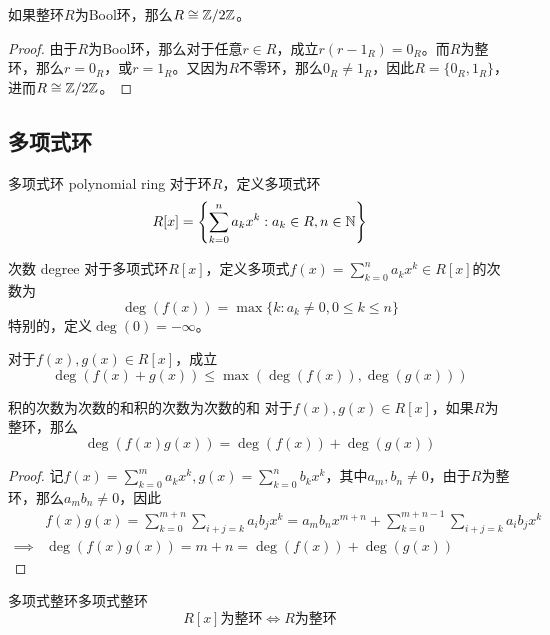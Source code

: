 \begin{proposition}
	如果整环$R$为Bool环，那么$R\cong \mathbb{Z}/2\mathbb{Z}$。
\end{proposition}

\begin{proof}
	由于$R$为Bool环，那么对于任意$r\in R$，成立$r(r-1_R)=0_R$。而$R$为整环，那么$r=0_R$，或$r=1_R$。又因为$R$不零环，那么$0_R\ne 1_R$，因此$R=\{0_R,1_R\}$，进而$R\cong \mathbb{Z}/2\mathbb{Z}$。
\end{proof}

\subsection{多项式环}

\begin{definition}{多项式环 polynomial ring}
	对于环$R$，定义多项式环
	$$
	R[x]=\left\{ \sum_{k=0}^{n}a_kx^k:a_k\in R,n\in\mathbb{N} \right\}
	$$
\end{definition}

\begin{definition}{次数 degree}
	对于多项式环$R[x]$，定义多项式$\displaystyle f(x)=\sum_{k=0}^{n}a_kx^k\in R[x]$的次数为
	$$
	\deg(f(x))=\max\{ k:a_k\ne 0,0\le k \le n \}
	$$
	特别的，定义$\deg(0)=-\infty$。
\end{definition}

\begin{proposition}
	对于$f(x),g(x)\in R[x]$，成立
	$$
	\deg(f(x)+g(x))\le \max(\deg(f(x)),\deg(g(x)))
	$$
\end{proposition}

\begin{proposition}{积的次数为次数的和}{积的次数为次数的和}
	对于$f(x),g(x)\in R[x]$，如果$R$为整环，那么
	$$
	\deg(f(x)g(x))=\deg(f(x))+\deg(g(x))
	$$
\end{proposition}

\begin{proof}
	记$\displaystyle f(x)=\sum_{k=0}^{m}a_k x^k,g(x)=\sum_{k=0}^{n}b_k x^k$，其中$a_m,b_n\ne0$，由于$R$为整环，那么$a_mb_n\ne 0$，因此
	\begin{align*}
		&f(x)g(x)=\sum_{k=0}^{m+n}\sum_{i+j=k}a_i b_j x^{k}=a_mb_nx^{m+n}+\sum_{k=0}^{m+n-1}\sum_{i+j=k}a_i b_j x^{k}\\
		\implies &\deg(f(x)g(x))=m+n=\deg(f(x))+\deg(g(x))
	\end{align*}
\end{proof}

\begin{proposition}{多项式整环}{多项式整环}
	$$
	R[x]\text{为整环}\iff R\text{为整环}
	$$
\end{proposition}

